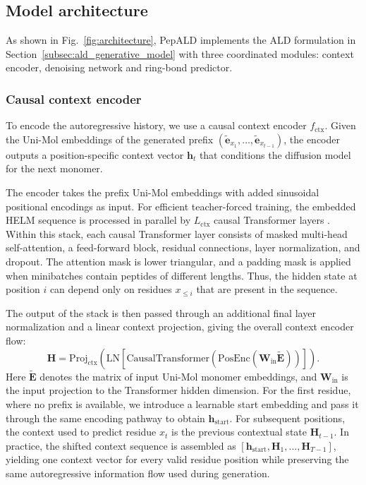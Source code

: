 \begin{methods}
\subsection{Model architecture}\label{subsec:ald}

As shown in Fig.~\ref{fig:architecture}, PepALD implements the ALD formulation in Section~\ref{subsec:ald_generative_model} with three coordinated modules: context encoder, denoising network and ring-bond predictor.

\subsubsection{Causal context encoder}\label{subsubsec:context_encoder}

To encode the autoregressive history, we use a causal context encoder $f_{\mathrm{ctx}}$.
Given the Uni-Mol embeddings of the generated prefix $(\tilde{\mathbf{e}}_{x_1}, \ldots, \tilde{\mathbf{e}}_{x_{t-1}})$, the encoder outputs a position-specific context vector $\mathbf{h}_t$ that conditions the diffusion model for the next monomer.

The encoder takes the prefix Uni-Mol embeddings with added sinusoidal positional encodings as input.
For efficient teacher-forced training, the embedded HELM sequence is processed in parallel by $L_{\mathrm{ctx}}$ causal Transformer layers \citep{ref_transformer}.
Within this stack, each causal Transformer layer consists of masked multi-head self-attention, a feed-forward block, residual connections, layer normalization, and dropout.
The attention mask is lower triangular, and a padding mask is applied when minibatches contain peptides of different lengths.
Thus, the hidden state at position $i$ can depend only on residues $x_{\leq i}$ that are present in the sequence.

The output of the stack is then passed through an additional final layer normalization and a linear context projection, giving the overall context encoder flow:
\begin{equation}
\mathbf{H} = \mathrm{Proj}_{\mathrm{ctx}}\!\left(\mathrm{LN}\!\left[\mathrm{CausalTransformer}\!\left(\mathrm{PosEnc}(\mathbf{W}_{\mathrm{in}}\tilde{\mathbf{E}})\right)\right]\right).
\label{eq:causal_encoder}
\end{equation}
Here $\tilde{\mathbf{E}}$ denotes the matrix of input Uni-Mol monomer embeddings, and $\mathbf{W}_{\mathrm{in}}$ is the input projection to the Transformer hidden dimension.
For the first residue, where no prefix is available, we introduce a learnable start embedding and pass it through the same encoding pathway to obtain $\mathbf{h}_{\mathrm{start}}$.
For subsequent positions, the context used to predict residue $x_t$ is the previous contextual state $\mathbf{H}_{t-1}$.
In practice, the shifted context sequence is assembled as $[\mathbf{h}_{\mathrm{start}}, \mathbf{H}_1,\ldots,\mathbf{H}_{T-1}]$, yielding one context vector for every valid residue position while preserving the same autoregressive information flow used during generation.


\end{methods}

